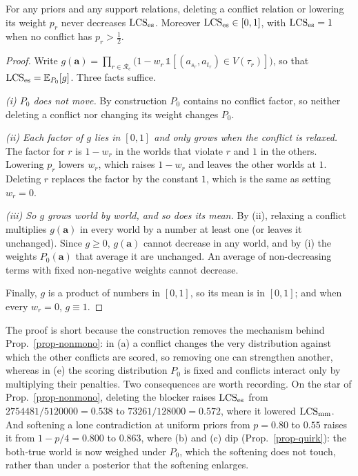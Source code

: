 \begin{theorem}
\label{thm-escape}
For any priors and any support relations, deleting a conflict relation or lowering its weight
$p_r$ never decreases $\mathrm{LCS}_{\mathrm{es}}$. Moreover $\mathrm{LCS}_{\mathrm{es}}\in[0,1]$, with $\mathrm{LCS}_{\mathrm{es}}=1$ when no
conflict has $p_r>\tfrac12$.
\end{theorem}
\begin{proof}
Write $g(\mathbf{a})=\prod_{r\in\mathcal{R}_{\mathrm{c}}}\bigl(1-w_r\,\mathbb{1}[(a_{s_r},
a_{t_r})\in V(\tau_r)]\bigr)$, so that $\mathrm{LCS}_{\mathrm{es}}=\mathbb{E}_{P_0}[g]$. Three facts suffice.

\emph{(i) $P_0$ does not move.} By construction $P_0$ contains no conflict factor, so neither
deleting a conflict nor changing its weight changes $P_0$.

\emph{(ii) Each factor of $g$ lies in $[0,1]$ and only grows when the conflict is relaxed.} The
factor for $r$ is $1-w_r$ in the worlds that violate $r$ and $1$ in the others. Lowering $p_r$ lowers
$w_r$, which raises $1-w_r$ and leaves the other worlds at $1$. Deleting $r$ replaces the factor by
the constant $1$, which is the same as setting $w_r=0$.

\emph{(iii) So $g$ grows world by world, and so does its mean.} By (ii), relaxing a conflict
multiplies $g(\mathbf{a})$ in every world by a number at least one (or leaves it unchanged). Since
$g\ge0$, $g(\mathbf{a})$ cannot decrease in any world, and by (i) the weights $P_0(\mathbf{a})$
that average it are unchanged. An average of non-decreasing terms with fixed non-negative weights
cannot decrease.

Finally, $g$ is a product of numbers in $[0,1]$, so its mean is in $[0,1]$; and when every $w_r=0$,
$g\equiv1$.
\end{proof}

The proof is short because the construction removes the mechanism behind
Prop.~\ref{prop-nonmono}: in (a) a conflict changes the very distribution against which the other
conflicts are scored, so removing one can strengthen another, whereas in (e) the scoring
distribution $P_0$ is fixed and conflicts interact only by multiplying their penalties. Two
consequences are worth recording. On the star of Prop.~\ref{prop-nonmono}, deleting the blocker
raises $\mathrm{LCS}_{\mathrm{es}}$ from $2754481/5120000=0.538$ to $73261/128000=0.572$, where it lowered
$\mathrm{LCS}_{\mathrm{mm}}$. And softening a lone contradiction at uniform priors from $p=0.80$ to $0.55$ raises it
from $1-p/4=0.800$ to $0.863$, where (b) and (c) dip (Prop.~\ref{prop-quirk}): the both-true world is now weighed under
$P_0$, which the softening does not touch, rather than under a posterior that the softening
enlarges.

